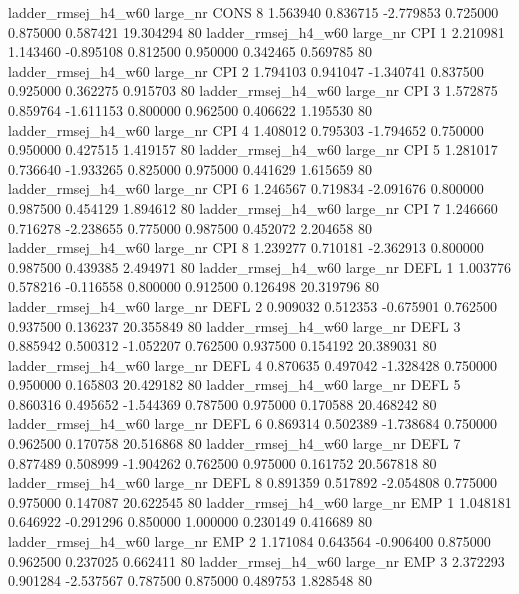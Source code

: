 ladder_rmsej_h4_w60   large_nr     CONS                 8  1.563940  0.836715  -2.779853 0.725000 0.875000  0.587421   19.304294 80
ladder_rmsej_h4_w60   large_nr      CPI                 1  2.210981  1.143460  -0.895108 0.812500 0.950000  0.342465    0.569785 80
ladder_rmsej_h4_w60   large_nr      CPI                 2  1.794103  0.941047  -1.340741 0.837500 0.925000  0.362275    0.915703 80
ladder_rmsej_h4_w60   large_nr      CPI                 3  1.572875  0.859764  -1.611153 0.800000 0.962500  0.406622    1.195530 80
ladder_rmsej_h4_w60   large_nr      CPI                 4  1.408012  0.795303  -1.794652 0.750000 0.950000  0.427515    1.419157 80
ladder_rmsej_h4_w60   large_nr      CPI                 5  1.281017  0.736640  -1.933265 0.825000 0.975000  0.441629    1.615659 80
ladder_rmsej_h4_w60   large_nr      CPI                 6  1.246567  0.719834  -2.091676 0.800000 0.987500  0.454129    1.894612 80
ladder_rmsej_h4_w60   large_nr      CPI                 7  1.246660  0.716278  -2.238655 0.775000 0.987500  0.452072    2.204658 80
ladder_rmsej_h4_w60   large_nr      CPI                 8  1.239277  0.710181  -2.362913 0.800000 0.987500  0.439385    2.494971 80
ladder_rmsej_h4_w60   large_nr     DEFL                 1  1.003776  0.578216  -0.116558 0.800000 0.912500  0.126498   20.319796 80
ladder_rmsej_h4_w60   large_nr     DEFL                 2  0.909032  0.512353  -0.675901 0.762500 0.937500  0.136237   20.355849 80
ladder_rmsej_h4_w60   large_nr     DEFL                 3  0.885942  0.500312  -1.052207 0.762500 0.937500  0.154192   20.389031 80
ladder_rmsej_h4_w60   large_nr     DEFL                 4  0.870635  0.497042  -1.328428 0.750000 0.950000  0.165803   20.429182 80
ladder_rmsej_h4_w60   large_nr     DEFL                 5  0.860316  0.495652  -1.544369 0.787500 0.975000  0.170588   20.468242 80
ladder_rmsej_h4_w60   large_nr     DEFL                 6  0.869314  0.502389  -1.738684 0.750000 0.962500  0.170758   20.516868 80
ladder_rmsej_h4_w60   large_nr     DEFL                 7  0.877489  0.508999  -1.904262 0.762500 0.975000  0.161752   20.567818 80
ladder_rmsej_h4_w60   large_nr     DEFL                 8  0.891359  0.517892  -2.054808 0.775000 0.975000  0.147087   20.622545 80
ladder_rmsej_h4_w60   large_nr      EMP                 1  1.048181  0.646922  -0.291296 0.850000 1.000000  0.230149    0.416689 80
ladder_rmsej_h4_w60   large_nr      EMP                 2  1.171084  0.643564  -0.906400 0.875000 0.962500  0.237025    0.662411 80
ladder_rmsej_h4_w60   large_nr      EMP                 3  2.372293  0.901284  -2.537567 0.787500 0.875000  0.489753    1.828548 80
